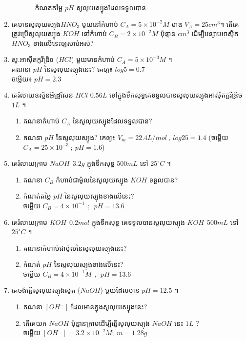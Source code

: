 \documentclass[12pt, a4paper]{article}
\begin{document}
\begin{enumerate}[m]
\begin{enumerate}[k]
\begin{enumerate}[m]
			កំណតតម្លៃ $pH$ សូលុយស្យុងដែលទទួលបាន
		\end{enumerate}
	\end{enumerate}
	\item គេមានសូលុយស្យុង$HNO_3$ មួយនៅកំហាប់ $C_A=5\times10^{-2}M$ មាឌ $V_A=25cm^3$។
	តើគេត្រូវប្រើសូលុយស្យុង $KOH$ នៅកំហាប់ $C_B=2\times10^{-2}M$ ប៉ុន្មាន $cm^3$ ដើម្បីបន្សាបអាស៊ីត $HNO_3$ ខាងលើនេះឲ្យសាប់អស់? 
	\item សូ.អាស៊ីតក្លរីឌ្រិច ($HCl$) មួយមានកំហាប់ $C_A=5\times10^{-3}M$ ។\\
	គណនា $pH$ នៃសូលុយស្យុងនេះ? គេឲ្យ៖ $log5=0.7$\\
	ចម្លើយ៖ $pH=2.3$ 
	\item គេរំលាយឧស្ម័នអ៊ីដ្រូសែន $HCl$ $0.56L$ ទៅក្នុងទឹកសុទ្ធគេទទួលបានសូលុយស្យុងអាស៊ីតក្លរីឌ្រិច $1L$ ។
	\begin{enumerate}[k]
		\item គណនាកំហាប់ $C_A$ នៃសូលុយស្យុងដែលទទួលបាន? 
		\item គណនា $pH$ នៃសូលុយស្យុង? គេឲ្យ៖ $V_m=22.4L/mol~,~log25=1.4$ (ចម្លើយ $C_A=25\times10^{-3}~;~pH=1.6$)
	\end{enumerate}
	\item គេរំលាយក្រាម $NaOH~~3.2g$ ក្នុងទឹកសុទ្ធ $500mL$ នៅ $25^\circ C$ ។
	\begin{enumerate}[k]
		\item គណនា $C_B$ កំហាប់ជាម៉ូលនៃសូលុយស្យុង $KOH$ ទទួលបាន?
		\item កំណត់តម្លៃ $pH$ នៃសូលុយស្យុងខាងលើនេះ? \\ចម្លើយ $C_B=4\times10^{-1}~~;~~pH=13.6$
	\end{enumerate}
	\item គេរំលាយក្រាម $KOH~~0.2mol$ ក្នុងទឺកសុទ្ធ គេទទួលបានសូលុយស្យុង $KOH~~500mL$ នៅ $25^\circ C$ ។
	\begin{enumerate}[k]
		\item គណនាកំហាប់ជាម៉ូលនៃសូលុយស្យុងនេះ?
		\item កំណត់ $pH$ នៃសូលុយស្យុងខាងលើនេះ? \\ចម្លើយ $C_B=4\times10^{-1} M~~,~~pH=13.6$ 
	\end{enumerate}
	\item គេចង់ធ្វើសូលុយស្យុងស៊ូត ($NaOH$) មួយដែលមាន $pH=12.5$ ។
	\begin{enumerate}[k]
		\item គណនា $[OH^-]$ ដែលមានក្នុងសូលុយស្យុងនេះ?
		\item តើគេយក $NaOH$ ប៉ុន្មានក្រាមដើម្បីធ្វើសូលុយស្យុង $NaOH$ នេះ $1L$ ?\\ ចម្លើយ $[OH^-]=3.2\times10^{-2}M;~m=1.28g$

\end{enumerate}
\end{enumerate}
\end{document}
